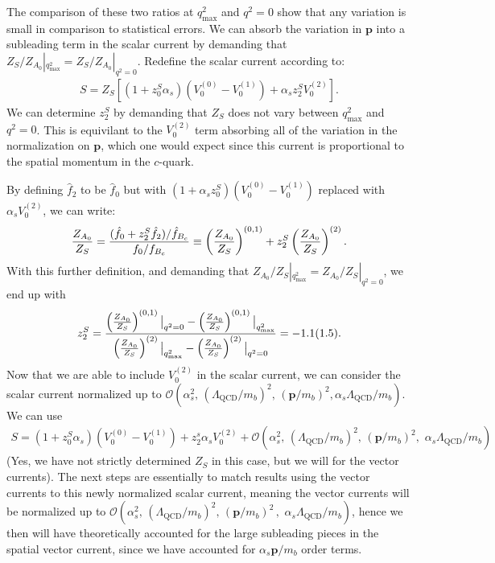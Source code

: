The comparison of these two ratios at $q^2_{\text{max}}$ and $q^2=0$ show that any variation is small in comparison to statistical errors. We can absorb the variation in ${\textbf{p}}$ into a subleading term in the scalar current by demanding that $Z_{S}/Z_{A_0}|_{q^2_{\text{max}}} = Z_{S}/Z_{A_0}|_{q^2=0}$. Redefine the scalar current according to:
\begin{align}
 S = Z_{S} \left[ (1 + z^{S}_0 \alpha_s)( V_0^{(0)} - V_0^{(1)} ) + \alpha_s z^{S}_2 V_0^{(2)} \right].
\end{align}
We can determine $z_2^S$ by demanding that $Z_S$ does not vary between $q^2_{\text{max}}$ and $q^2=0$. This is equivilant to the $V_0^{(2)}$ term absorbing all of the variation in the normalization on ${\textbf{p}}$, which one would expect since this current is proportional to the spatial momentum in the $c$-quark.

By defining $\hat{f}_2$ to be $\hat{f}_0$ but with $(1+\alpha_s z_0^S)( V_0^{(0)} - V_0^{(1)} )$ replaced with $\alpha_s V_0^{(2)}$, we can write:
\begin{align}
	{Z_{A_0}\over Z_{S}} = { ( \hat{f}_0 + z^S_2 \hat{f}_2 )/ \hat{f}_{B_c}  \over f_0/f_{B_c} } \equiv \left({Z_{A_0}\over Z_{S}}\right)^{(0,1)} + z^S_2 \left({Z_{A_0}\over Z_{S}}\right)^{(2)}.
\end{align}
With this further definition, and demanding that ${Z_{A_0}/ Z_{S}}|_{q^2_{\text{max}}} = {Z_{A_0}/ Z_{S}}|_{q^2=0}$, we end up with
\begin{align}
	z^S_2 = { \left({Z_{A_0}\over Z_{S}}\right)^{(0,1)}\big\vert_{q^2=0} - \left({Z_{A_0}\over Z_{S}}\right)^{(0,1)}\big\vert_{q^2_{\text{max}}}
\over \left({Z_{A_0}\over Z_{S}}\right)^{(2)}\big\vert_{q^2_{\text{max}}} - \left({Z_{A_0}\over Z_{S}}\right)^{(2)}\big\vert_{q^2=0} }
 = -1.1(1.5).
\end{align}
Now that we are able to include $V_0^{(2)}$ in the scalar current, we can consider the scalar current normalized up to $\mathcal{O}(\alpha_s^2, \,(\Lambda_{\text{QCD}}/m_b)^2, \,({\textbf{p}}/m_b)^2, \alpha_s\Lambda_{\text{QCD}}/m_b )$. We can use
\begin{align}
  S = (1+z_0^S\alpha_s)( V_0^{(0)} - V_0^{(1)} ) + z_2^s\alpha_s V_0^{(2)} + \mathcal{O}(\alpha_s^2, \,(\Lambda_{\text{QCD}}/m_b)^2, \,({\textbf{p}}/m_b)^2,\,\, \alpha_s\Lambda_{\text{QCD}}/m_b )
\end{align}
(Yes, we have not strictly determined $Z_S$ in this case, but we will for the vector currents). The next steps are essentially to match results using the vector currents to this newly normalized scalar current, meaning the vector currents will be normalized up to $\mathcal{O}(\alpha_s^2, \,(\Lambda_{\text{QCD}}/m_b)^2, \,({\textbf{p}}/m_b)^2 \,,\,\, \alpha_s\Lambda_{\text{QCD}}/m_b)$, hence we then will have theoretically accounted for the large subleading pieces in the spatial vector current, since we have accounted for $\alpha_s{\textbf{p}}/m_b$ order terms.

